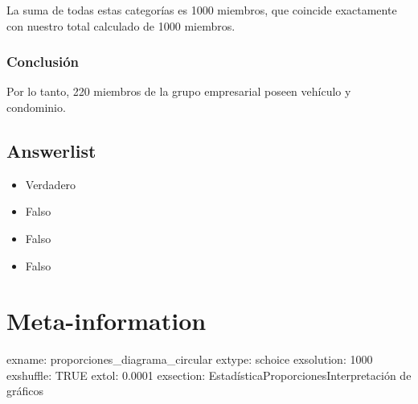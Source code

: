 \documentclass[
]{article}
\providecommand{\tightlist}{%
  \setlength{\itemsep}{0pt}\setlength{\parskip}{0pt}}
\begin{document}
La suma de todas estas categorías es 1000 miembros, que coincide
exactamente con nuestro total calculado de 1000 miembros.

\subsubsection{Conclusión}\label{conclusiuxf3n}

Por lo tanto, 220 miembros de la grupo empresarial poseen vehículo y
condominio.

\subsection{Answerlist}\label{answerlist-1}

\begin{itemize}
\tightlist
\item
  Verdadero
\item
  Falso
\item
  Falso
\item
  Falso
\end{itemize}

\section{Meta-information}\label{meta-information}

exname: proporciones\_diagrama\_circular extype: schoice exsolution:
1000 exshuffle: TRUE extol: 0.0001 exsection:
Estadística\textbar Proporciones\textbar Interpretación de gráficos
\end{document}
